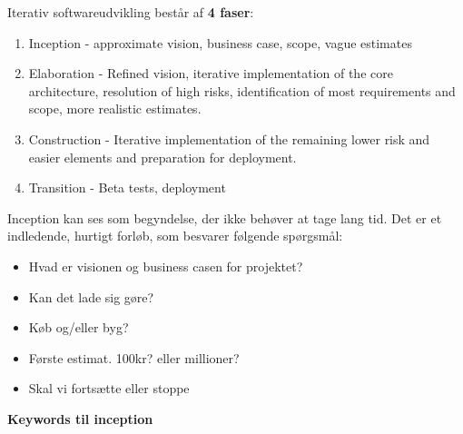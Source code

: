 Iterativ softwareudvikling består af \textbf{4 faser}:

\begin{enumerate}
	\item{Inception - approximate vision, business case, scope, vague estimates}
	\item{Elaboration - Refined vision, iterative implementation of the core architecture,
	            resolution of high risks, identification of most requirements and scope, more realistic estimates.}
	\item{Construction - Iterative implementation of the remaining lower risk and easier elements
	            and preparation for deployment.}
	\item{Transition - Beta tests, deployment}
\end{enumerate}


Inception kan ses som begyndelse, der ikke behøver at tage lang tid.
Det er et indledende, hurtigt forløb, som besvarer følgende spørgsmål:

\begin{itemize}
	\item{Hvad er visionen og business casen for projektet?}
	\item{Kan det lade sig gøre?}
	\item{Køb og/eller byg?}
	\item{Første estimat. 100kr? eller millioner?}
	\item{Skal vi fortsætte eller stoppe}
\end{itemize}

\textbf{Keywords til inception}

